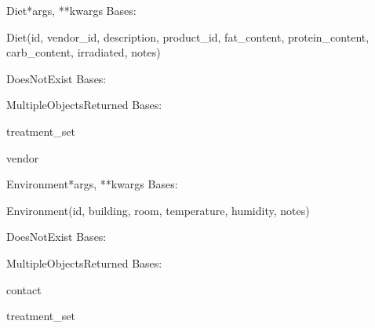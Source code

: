 \documentclass[letterpaper,10pt,english]{sphinxmanual}
\begin{document}
\hypertarget{data.models.Diet}{}\begin{classdesc}{Diet}{*args, **kwargs}
Bases: 

Diet(id, vendor\_id, description, product\_id, fat\_content, protein\_content, carb\_content, irradiated, notes)

\hypertarget{data.models.Diet.DoesNotExist}{}\begin{excdesc}{DoesNotExist}
Bases: 
\end{excdesc}

\hypertarget{data.models.Diet.MultipleObjectsReturned}{}\begin{excdesc}{MultipleObjectsReturned}
Bases: 
\end{excdesc}

\hypertarget{data.models.Diet.treatment_set}{}\begin{memberdesc}[Diet]{treatment\_set}\end{memberdesc}

\hypertarget{data.models.Diet.vendor}{}\begin{memberdesc}[Diet]{vendor}\end{memberdesc}
\end{classdesc}

\hypertarget{data.models.Environment}{}\begin{classdesc}{Environment}{*args, **kwargs}
Bases: 

Environment(id, building, room, temperature, humidity, notes)

\hypertarget{data.models.Environment.DoesNotExist}{}\begin{excdesc}{DoesNotExist}
Bases: 
\end{excdesc}

\hypertarget{data.models.Environment.MultipleObjectsReturned}{}\begin{excdesc}{MultipleObjectsReturned}
Bases: 
\end{excdesc}

\hypertarget{data.models.Environment.contact}{}\begin{memberdesc}[Environment]{contact}\end{memberdesc}

\hypertarget{data.models.Environment.treatment_set}{}\begin{memberdesc}[Environment]{treatment\_set}\end{memberdesc}
\end{classdesc}
\end{document}
